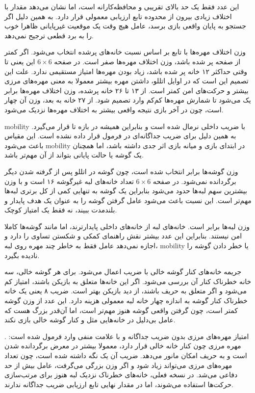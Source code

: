 \documentclass[10.5pt]{exam}
\begin{document}
این عدد فقط یک حد بالای تقریبی و محافظه‌کارانه است، اما نشان می‌دهد مقدار
با اختلاف زیادی بیرون از محدوده تابع ارزیابی معمولی قرار دارد. به همین دلیل اگر جستجو به پایان واقعی بازی برسد، عامل هیچ وقت یک موقعیت غیرپایانی ظاهرا خوب را به برد قطعی ترجیح نمی‌دهد.

وزن اختلاف مهره‌ها با تابع
بر اساس نسبت خانه‌های پرشده انتخاب می‌شود. اگر کمتر از
صفحه پر شده باشد، وزن اختلاف مهره‌ها صفر است. در صفحه
\(6\times6\)
این یعنی تا وقتی حداکثر ۱۲ خانه پر شده باشد، زیاد بودن مهره‌ها امتیاز مستقیمی ندارد. علت این تصمیم این است که در اوایل اتللو، داشتن مهره بیشتر معمولا به معنی مهره‌های مرزی بیشتر و حرکت‌های امن کمتر است. از ۱۳ تا ۲۶ خانه پرشده، وزن اختلاف مهره‌ها برابر یک می‌شود تا شمارش مهره‌ها کم‌کم وارد تصمیم شود. از ۲۷ خانه به بعد، وزن آن چهار است، چون در آخر بازی نتیجه واقعی بیشتر به اختلاف مهره‌ها نزدیک می‌شود.

mobility با ضریب داخلی
نرمال شده است و بنابراین همیشه در بازه
تا
قرار می‌گیرد. به همین دلیل برای
ضریب جداگانه‌ای در فرمول قرار داده نشده است. این مقیاس باعث می‌شود mobility در ابتدای بازی و میانه بازی اثر جدی داشته باشد، اما همچنان یک گوشه یا حالت پایانی بتواند از آن مهم‌تر باشد.

وزن گوشه‌ها برابر
انتخاب شده است، چون گوشه در اتللو پس از گرفته شدن دیگر برگردانده نمی‌شود. در صفحه
\(6\times6\)
تعداد خانه‌های لبه غیرگوشه ۱۶ است و با وزن
بیشترین سهم لبه‌ها حدود
می‌شود بنابراین یک گوشه به تنهایی کمی از کل برتری لبه‌ها مهم‌تر است. این نسبت باعث می‌شود عامل گرفتن گوشه را به عنوان یک هدف پایدار و بلندمدت ببیند، نه فقط یک امتیاز کوچک.

وزن لبه‌ها برابر
است. خانه‌های لبه از خانه‌های داخلی پایدارترند، اما مانند گوشه‌ها کاملا امن نیستند. بنابراین این عدد بیشتر نقش راهنمای کمکی و شکستن تساوی را دارد و اجازه نمی‌دهد عامل فقط به خاطر چند مهره روی لبه، mobility یا خطر دادن گوشه را نادیده بگیرد.

جریمه خانه‌های کنار گوشه خالی با ضریب
اعمال می‌شود. برای هر گوشه خالی، سه خانه خطرناک کنار آن بررسی می‌شود. اگر این خانه‌ها متعلق به بازیکن باشند، امتیاز کم می‌شود و اگر متعلق به حریف باشند، از دید بازیکن بهتر است. ضریب ۸ یعنی یک خانه خطرناک کنار گوشه به اندازه چهار خانه لبه معمولی هزینه دارد. این عدد از وزن گوشه کمتر است، چون گرفتن واقعی گوشه هنوز مهم‌تر است، اما آن‌قدر بزرگ هست که عامل بی‌دلیل در خانه‌هایی مثل
و
کنار گوشه خالی بازی نکند.

امتیاز مهره‌های مرزی بدون ضریب جداگانه و با علامت منفی وارد فرمول شده است:
.
مهره مرزی چون کنار خانه خالی قرار دارد، معمولا بیشتر در معرض برگردانده شدن است و به حریف امکان مانور می‌دهد. ضریب آن یک نگه داشته شده است، چون تعداد مهره‌های مرزی می‌تواند زیاد شود و اگر وزن بزرگی می‌گرفت، عامل بیش از حد دفاعی می‌شد. در نسخه فعلی، خانه‌های خطرناک نزدیک لبه هنوز برای مرتب‌سازی حرکت‌ها استفاده می‌شوند، اما در مقدار نهایی تابع ارزیابی ضریب جداگانه ندارند.
\end{document}
